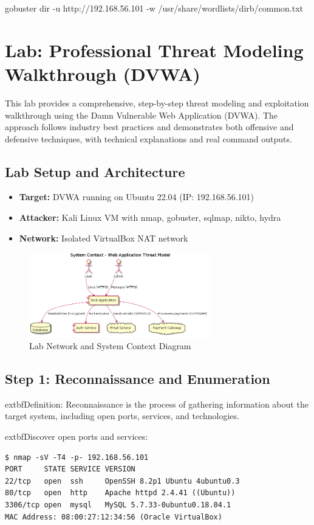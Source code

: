 gobuster dir -u http://192.168.56.101 -w /usr/share/wordlists/dirb/common.txt


\section*{Lab: Professional Threat Modeling Walkthrough (DVWA)}
This lab provides a comprehensive, step-by-step threat modeling and exploitation walkthrough using the Damn Vulnerable Web Application (DVWA)\cite{owasp}. The approach follows industry best practices\cite{shostack2014,uceda2015} and demonstrates both offensive and defensive techniques, with technical explanations and real command outputs.

\subsection*{Lab Setup and Architecture}
\begin{itemize}
    \item \textbf{Target:} DVWA running on Ubuntu 22.04 (IP: 192.168.56.101)
    \item \textbf{Attacker:} Kali Linux VM with nmap, gobuster, sqlmap, nikto, hydra
    \item \textbf{Network:} Isolated VirtualBox NAT network
\end{itemize}

\begin{figure}[H]
    \centering
    \includegraphics[width=0.7\textwidth]{images/system-context}
    \caption{Lab Network and System Context Diagram}
\end{figure}

\subsection*{Step 1: Reconnaissance and Enumeration}
	extbf{Definition:} Reconnaissance is the process of gathering information about the target system, including open ports, services, and technologies\cite{nist800154}.

	extbf{Discover open ports and services:}
\begin{verbatim}
$ nmap -sV -T4 -p- 192.168.56.101
PORT     STATE SERVICE VERSION
22/tcp   open  ssh     OpenSSH 8.2p1 Ubuntu 4ubuntu0.3
80/tcp   open  http    Apache httpd 2.4.41 ((Ubuntu))
3306/tcp open  mysql   MySQL 5.7.33-0ubuntu0.18.04.1
MAC Address: 08:00:27:12:34:56 (Oracle VirtualBox)
\end{verbatim}


